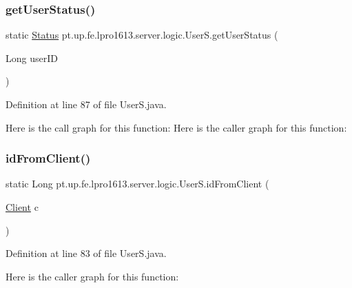 \subsubsection{\texorpdfstring{get\+User\+Status()}{getUserStatus()}}
{\footnotesize\ttfamily static \hyperlink{enumpt_1_1up_1_1fe_1_1lpro1613_1_1sharedlib_1_1tuples_1_1_user_info_1_1_status}{Status} pt.\+up.\+fe.\+lpro1613.\+server.\+logic.\+User\+S.\+get\+User\+Status (\begin{DoxyParamCaption}\item[{Long}]{user\+ID }\end{DoxyParamCaption})\hspace{0.3cm}{\ttfamily [static]}}



Definition at line 87 of file User\+S.\+java.

Here is the call graph for this function\+:
Here is the caller graph for this function\+:
\hypertarget{classpt_1_1up_1_1fe_1_1lpro1613_1_1server_1_1logic_1_1_user_s_a6ce47ad78e634c757be0ffc905799b4c}{}\label{classpt_1_1up_1_1fe_1_1lpro1613_1_1server_1_1logic_1_1_user_s_a6ce47ad78e634c757be0ffc905799b4c} 
\subsubsection{\texorpdfstring{id\+From\+Client()}{idFromClient()}}
{\footnotesize\ttfamily static Long pt.\+up.\+fe.\+lpro1613.\+server.\+logic.\+User\+S.\+id\+From\+Client (\begin{DoxyParamCaption}\item[{\hyperlink{classpt_1_1up_1_1fe_1_1lpro1613_1_1server_1_1conn_1_1_client}{Client}}]{c }\end{DoxyParamCaption})\hspace{0.3cm}{\ttfamily [static]}}



Definition at line 83 of file User\+S.\+java.

Here is the caller graph for this function\+:
\hypertarget{classpt_1_1up_1_1fe_1_1lpro1613_1_1server_1_1logic_1_1_user_s_abe3cf61bff09cb09e3ed0a5564e98257}{}\label{classpt_1_1up_1_1fe_1_1lpro1613_1_1server_1_1logic_1_1_user_s_abe3cf61bff09cb09e3ed0a5564e98257} 
